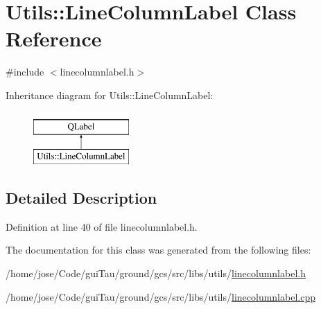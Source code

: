 \hypertarget{class_utils_1_1_line_column_label}{\section{Utils\-:\-:Line\-Column\-Label Class Reference}
\label{class_utils_1_1_line_column_label}
}


{\ttfamily \#include $<$linecolumnlabel.\-h$>$}

Inheritance diagram for Utils\-:\-:Line\-Column\-Label\-:\begin{figure}[H]
\begin{center}
\leavevmode
\includegraphics[height=2.000000cm]{class_utils_1_1_line_column_label}
\end{center}
\end{figure}


\subsection{Detailed Description}


Definition at line 40 of file linecolumnlabel.\-h.



The documentation for this class was generated from the following files\-:\begin{DoxyCompactItemize}
\item 
/home/jose/\-Code/gui\-Tau/ground/gcs/src/libs/utils/\hyperlink{linecolumnlabel_8h}{linecolumnlabel.\-h}\item 
/home/jose/\-Code/gui\-Tau/ground/gcs/src/libs/utils/\hyperlink{linecolumnlabel_8cpp}{linecolumnlabel.\-cpp}\end{DoxyCompactItemize}
